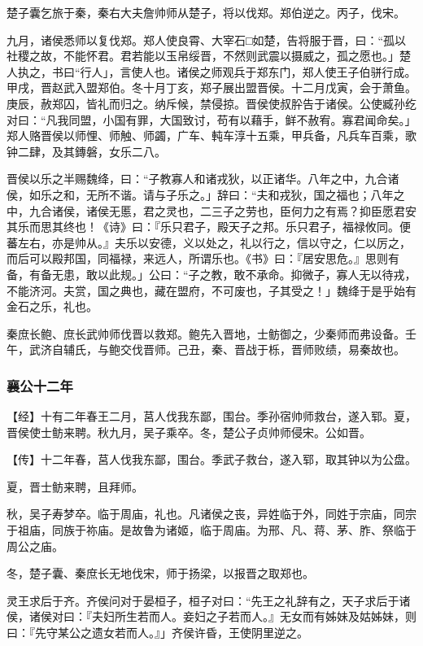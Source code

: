\documentclass[]{article}
\begin{document}
楚子囊乞旅于秦，秦右大夫詹帅师从楚子，将以伐郑。郑伯逆之。丙子，伐宋。

九月，诸侯悉师以复伐郑。郑人使良霄、大宰石□如楚，告将服于晋，曰：``孤以社稷之故，不能怀君。君若能以玉帛绥晋，不然则武震以摄威之，孤之愿也。」楚人执之，书曰``行人」，言使人也。诸侯之师观兵于郑东门，郑人使王子伯骈行成。甲戌，晋赵武入盟郑伯。冬十月丁亥，郑子展出盟晋侯。十二月戊寅，会于萧鱼。庚辰，赦郑囚，皆礼而归之。纳斥候，禁侵掠。晋侯使叔肸告于诸侯。公使臧孙纥对曰：``凡我同盟，小国有罪，大国致讨，苟有以藉手，鲜不赦宥。寡君闻命矣。」郑人赂晋侯以师悝、师触、师蠲，广车、軘车淳十五乘，甲兵备，凡兵车百乘，歌钟二肆，及其鏄磐，女乐二八。

晋侯以乐之半赐魏绛，曰：``子教寡人和诸戎狄，以正诸华。八年之中，九合诸侯，如乐之和，无所不谐。请与子乐之。」辞曰：``夫和戎狄，国之福也；八年之中，九合诸侯，诸侯无慝，君之灵也，二三子之劳也，臣何力之有焉？抑臣愿君安其乐而思其终也！《诗》曰：『乐只君子，殿天子之邦。乐只君子，福禄攸同。便蕃左右，亦是帅从。』夫乐以安德，义以处之，礼以行之，信以守之，仁以厉之，而后可以殿邦国，同福禄，来远人，所谓乐也。《书》曰：『居安思危。』思则有备，有备无患，敢以此规。」公曰：``子之教，敢不承命。抑微子，寡人无以待戎，不能济河。夫赏，国之典也，藏在盟府，不可废也，子其受之！」魏绛于是乎始有金石之乐，礼也。

秦庶长鲍、庶长武帅师伐晋以救郑。鲍先入晋地，士鲂御之，少秦师而弗设备。壬午，武济自辅氏，与鲍交伐晋师。己丑，秦、晋战于栎，晋师败绩，易秦故也。

\hypertarget{header-n1965}{%
\subsubsection{襄公十二年}\label{header-n1965}}

【经】十有二年春王二月，莒人伐我东鄙，围台。季孙宿帅师救台，遂入郓。夏，晋侯使士鲂来聘。秋九月，吴子乘卒。冬，楚公子贞帅师侵宋。公如晋。

【传】十二年春，莒人伐我东鄙，围台。季武子救台，遂入郓，取其钟以为公盘。

夏，晋士鲂来聘，且拜师。

秋，吴子寿梦卒。临于周庙，礼也。凡诸侯之丧，异姓临于外，同姓于宗庙，同宗于祖庙，同族于祢庙。是故鲁为诸姬，临于周庙。为邢、凡、蒋、茅、胙、祭临于周公之庙。

冬，楚子囊、秦庶长无地伐宋，师于扬梁，以报晋之取郑也。

灵王求后于齐。齐侯问对于晏桓子，桓子对曰：``先王之礼辞有之，天子求后于诸侯，诸侯对曰：『夫妇所生若而人。妾妇之子若而人。』无女而有姊妹及姑姊妹，则曰：『先守某公之遗女若而人。』」齐侯许昏，王使阴里逆之。
\end{document}
